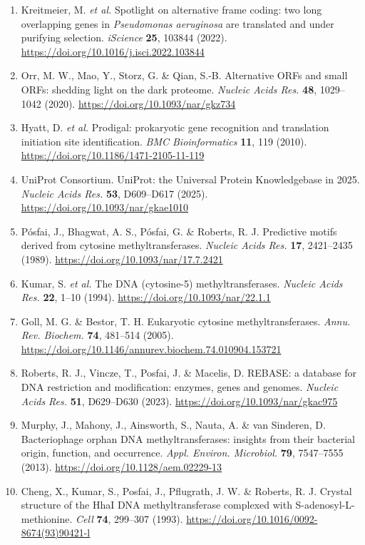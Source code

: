 \documentclass[10pt,letterpaper]{article}
\newcommand{\spname}[1]{\textit{#1}}
\begin{document}
{\begin{enumerate}[leftmargin=1.9em,itemsep=-0.6pt,parsep=0pt,topsep=0.5pt]
  \item Kreitmeier, M. \textit{et al.} Spotlight on alternative frame coding: two long overlapping genes in \spname{Pseudomonas aeruginosa} are translated and under purifying selection. \textit{iScience} \textbf{25}, 103844 (2022). \url{https://doi.org/10.1016/j.isci.2022.103844}
  \item Orr, M. W., Mao, Y., Storz, G. \& Qian, S.-B. Alternative ORFs and small ORFs: shedding light on the dark proteome. \textit{Nucleic Acids Res.} \textbf{48}, 1029--1042 (2020). \url{https://doi.org/10.1093/nar/gkz734}
  \item Hyatt, D. \textit{et al.} Prodigal: prokaryotic gene recognition and translation initiation site identification. \textit{BMC Bioinformatics} \textbf{11}, 119 (2010). \url{https://doi.org/10.1186/1471-2105-11-119}
  \item UniProt Consortium. UniProt: the Universal Protein Knowledgebase in 2025. \textit{Nucleic Acids Res.} \textbf{53}, D609--D617 (2025). \url{https://doi.org/10.1093/nar/gkae1010}
  \item P\'osfai, J., Bhagwat, A. S., P\'osfai, G. \& Roberts, R. J. Predictive motifs derived from cytosine methyltransferases. \textit{Nucleic Acids Res.} \textbf{17}, 2421--2435 (1989). \url{https://doi.org/10.1093/nar/17.7.2421}
  \item Kumar, S. \textit{et al.} The DNA (cytosine-5) methyltransferases. \textit{Nucleic Acids Res.} \textbf{22}, 1--10 (1994). \url{https://doi.org/10.1093/nar/22.1.1}
  \item Goll, M. G. \& Bestor, T. H. Eukaryotic cytosine methyltransferases. \textit{Annu. Rev. Biochem.} \textbf{74}, 481--514 (2005). \url{https://doi.org/10.1146/annurev.biochem.74.010904.153721}
  \item Roberts, R. J., Vincze, T., Posfai, J. \& Macelis, D. REBASE: a database for DNA restriction and modification: enzymes, genes and genomes. \textit{Nucleic Acids Res.} \textbf{51}, D629--D630 (2023). \url{https://doi.org/10.1093/nar/gkac975}
  \item Murphy, J., Mahony, J., Ainsworth, S., Nauta, A. \& van Sinderen, D. Bacteriophage orphan DNA methyltransferases: insights from their bacterial origin, function, and occurrence. \textit{Appl. Environ. Microbiol.} \textbf{79}, 7547--7555 (2013). \url{https://doi.org/10.1128/aem.02229-13}
  \item Cheng, X., Kumar, S., Posfai, J., Pflugrath, J. W. \& Roberts, R. J. Crystal structure of the HhaI DNA methyltransferase complexed with S-adenosyl-L-methionine. \textit{Cell} \textbf{74}, 299--307 (1993). \url{https://doi.org/10.1016/0092-8674(93)90421-l}

\end{enumerate}}
\end{document}
